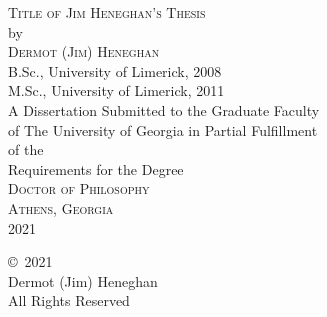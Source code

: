\documentclass[
reprint,
amsmath,amssymb,
aip,
jap,
floatfix,
]{revtex4-2}
\newcommand{\thesisyear}{2021} %
\newcommand{\yourname}{Dermot (Jim) Heneghan} %
\newcommand{\thesistitle}{Title of Jim Heneghan's Thesis} %
\begin{document}




\newpage
\setcounter{page}{1}
\thispagestyle{empty}
\vspace*{18pt}
\begin{center}
\textsc{\thesistitle}\\[18pt]
by\\[18pt]
\textsc{\yourname}\\[12pt]

B.Sc., University of Limerick, 2008\\
M.Sc., University of Limerick, 2011\\
\vfill
A Dissertation Submitted to the Graduate Faculty \\
of The University of Georgia in Partial Fulfillment \\
of the \\
Requirements for the Degree \\[10pt]
\textsc{Doctor of Philosophy}\\[36pt]
\textsc{Athens, Georgia}\\[18pt]
\thesisyear
\end{center}

\newpage
\thispagestyle{empty}
\vspace*{5.5in}
\begin{center}
\copyright~\thesisyear\ \\
\yourname\\
All Rights Reserved
\end{center}
\end{document}
